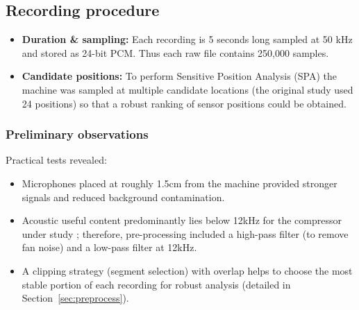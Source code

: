 \documentclass[12pt,a4paper]{article}
\begin{document}
\begin{multicols}{2}
\subsection{Recording procedure}
\begin{itemize}
  \item \textbf{Duration \& sampling:} Each recording is 5 seconds long sampled at 50 kHz and stored as 24-bit PCM. Thus each raw file contains 250,000 samples.
  \item \textbf{Candidate positions:} To perform Sensitive Position Analysis (SPA) the machine was sampled at multiple candidate locations (the original study used 24 positions) so that a robust ranking of sensor positions could be obtained.
\end{itemize}
\subsubsection{Preliminary observations}
Practical tests revealed:
\begin{itemize}
    \item Microphones placed at roughly {1.5}{cm} from the machine provided stronger signals and reduced background contamination.
    \item Acoustic useful content predominantly lies below {12}{kHz} for the compressor under study \cite{Verma2016}; therefore, pre-processing included a high-pass filter (to remove fan noise) and a low-pass filter at {12}{kHz}.
    \item A clipping strategy (segment selection) with overlap helps to choose the most stable portion of each recording for robust analysis (detailed in Section~\ref{sec:preprocess}).
\end{itemize}

\end{multicols}
\end{document}
